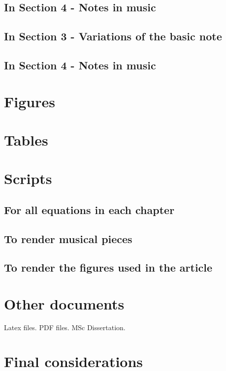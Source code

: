 \documentclass{scrreprt}
\begin{document}
\subsection{In Section 4 - Notes in music}

\subsection{In Section 3 - Variations of the basic note}
\subsection{In Section 4 - Notes in music}

\clearpage
\section{Figures}

\clearpage
\section{Tables}

\clearpage
\section{Scripts}
\subsection{For all equations in each chapter}
\clearpage
\subsection{To render musical pieces}
\clearpage
\subsection{To render the figures used in the article}

\clearpage
\section{Other documents}
Latex files. PDF files.
MSc Dissertation.

\section{Final considerations}
\end{document}
